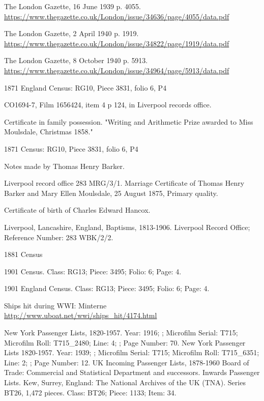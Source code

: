 \begin{thebibliography}{99}
	The London Gazette, 16 June 1939 p. 4055.
	\url{https://www.thegazette.co.uk/London/issue/34636/page/4055/data.pdf}
	
	The London Gazette, 2 April 1940 p. 1919.
	\url{https://www.thegazette.co.uk/London/issue/34822/page/1919/data.pdf}

	The London Gazette, 8 October 1940 p. 5913.
	\url{https://www.thegazette.co.uk/London/issue/34964/page/5913/data.pdf}
	
	1871 England Census: RG10, Piece 3831, folio 6, P4
	
	CO1694-7, Film 1656424, item 4 p 124, in Liverpool records office. 
	
	Certificate in family possession.
	"Writing and Arithmetic Prize awarded to Miss Moulsdale, Christmas 1858."
	
	1871 Census: RG10, Piece 3831, folio 6, P4 
	
	Notes made by Thomas Henry Barker. 
	
	Liverpool record office 283 MRG/3/1.
	Marriage Certificate of Thomas Henry Barker and Mary Ellen Moulsdale, 25 August 1875, Primary quality. 
	
	Certificate of birth of Charles Edward Hancox. 


	Liverpool, Lancashire, England, Baptisms, 1813-1906.
	Liverpool Record Office; Reference Number: 283 WBK/2/2.
	
	1881 Census
	
	1901 Census.
	Class: RG13; Piece: 3495; Folio: 6; Page: 4.
	
	1901 England Census.
	Class: RG13; Piece: 3495; Folio: 6; Page: 4.

	Ships hit during WWI: Minterne
	\url{http://www.uboat.net/wwi/ships_hit/4174.html}

	New York Passenger Lists, 1820-1957.
	Year: 1916; ; Microfilm Serial: T715; Microfilm Roll: T715\_2480; Line: 4; ; Page Number: 70.
	New York Passenger Lists 1820-1957.
	Year: 1939; ; Microfilm Serial: T715; Microfilm Roll: T715\_6351; Line: 2; ; Page Number: 12.
	UK Incoming Passenger Lists, 1878-1960 Board of Trade: Commercial and Statistical Department and successors.
	Inwards Passenger Lists. Kew, Surrey, England: The National Archives of the UK (TNA).
	Series BT26, 1,472 pieces. Class: BT26; Piece: 1133; Item: 34.


\end{thebibliography}
